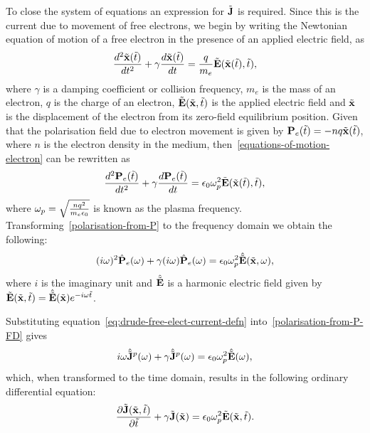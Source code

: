 To close the system of equations an expression for $\tilde{\mathbf{J}}$ is required. Since this is the current due to movement of free electrons, we begin by writing the Newtonian equation of motion of a free electron in the presence of an applied electric field, as
\begin{equation}
\frac{d^2 \tilde{\mathbf{x}}(\tilde{t}) }{dt^2}+ \gamma \frac{d \tilde{\mathbf{x}}(\tilde{t}) }{dt}= \frac{q}{m_e}\tilde{\mathbf{E}}(\tilde{\mathbf{x}}(\tilde{t}),\tilde{t}),
\label{equations-of-motion-electron}
\end{equation}
where $\gamma$ is a damping coefficient or collision frequency, $m_e$ is the mass of an electron, $q$ is the charge of an electron, $\tilde{\mathbf{E}}(\tilde{\mathbf{x}},\tilde{t})$ is the applied electric field and $\tilde{\mathbf{x}}$ is the displacement of the electron from its zero-field equilibrium position. Given that the polarisation field due to electron movement is given by $ \mathbf{P}_e(\tilde{t}) = - n q \tilde{\mathbf{x}}(\tilde{t})$, where $n$ is the electron density in the medium, then~\eqref{equations-of-motion-electron} can be rewritten as
\begin{equation}
\label{polarisation-from-P}
\frac{d^2 \mathbf{P}_e(\tilde{t}) }{dt^2} + \gamma \frac{d \mathbf{P}_e(\tilde{t}) }{dt} = \epsilon_0 \omega_p^2 \tilde{\mathbf{E}}(\tilde{\mathbf{x}}(\tilde{t}),\tilde{t}),
\end{equation}
where $\omega_p = \sqrt{\frac{n q^2}{m_e \epsilon_0}}$ is known as the plasma frequency.
%
Transforming~\eqref{polarisation-from-P} to the frequency domain we obtain the following:
\begin{equation}
\label{polarisation-from-P-FD}
( i \omega )^2 \hat{\mathbf{P}}_e(\omega) + \gamma (i \omega) \hat{\mathbf{P}}_e(\omega) = \epsilon_0 \omega_p^2 \hat{\tilde{\mathbf{E}}}(\tilde{\mathbf{x}},\omega),
\end{equation}
where $i$ is the imaginary unit and $\hat{\tilde{\mathbf{E}}}$ is a harmonic electric field given by $\tilde{\mathbf{E}}(\tilde{\mathbf{x}},\tilde{t}) = \hat{\tilde{\mathbf{E}}}(\tilde{\mathbf{x}}) e^{- i \omega \tilde{t} }$.

Substituting equation~\eqref{eq:drude-free-elect-current-defn} into~\eqref{polarisation-from-P-FD} gives
\begin{equation}
    \label{eq:pol-current-freq-domain}
  i \omega \hat{\tilde{\mathbf{J}}}^p(\omega) + \gamma \hat{\tilde{\mathbf{J}}}^p(\omega) = \epsilon_0 \omega_p^2 \hat{\tilde{\mathbf{E}}}(\omega) ,
\end{equation}
which, when transformed to the time domain, results in the following ordinary differential equation:
\begin{equation}
\frac{\partial\tilde{\mathbf{J}}(\tilde{\mathbf{x}},\tilde{t})}{\partial \tilde{t}} + \gamma \tilde{\mathbf{J}}(\tilde{\mathbf{x}}) = \epsilon_0 \omega_p^2 \tilde{\mathbf{E}}(\tilde{\mathbf{x}},\tilde{t}).
  \label{pol-current-ADE}
\end{equation}

